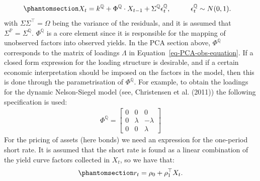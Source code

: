 \documentclass[
  letterpaper,
  DIV=11,
  numbers=noendperiod]{scrreprt}
\begin{document}
\begin{equation}\protect\phantomsection\label{eq-factorVarQ}{
\begin{align}
    X_{t} &= k^\mathbb{Q}+\Phi^\mathbb{Q} \cdot X_{t-1} +\Sigma^{\mathbb{Q}} \epsilon^\mathbb{Q}_{t}, \hspace{1cm} \epsilon^\mathbb{Q}_{t} \sim N(0,1).
\end{align}
}\end{equation} with \(\Sigma \Sigma^{\top}=\Omega\) being the variance
of the residuals, and it is assumed that
\(\Sigma^{\mathbb{P}}=\Sigma^{\mathbb{Q}}\). \(\Phi^{\mathbb{Q}}\) is a
core element since it is responsible for the mapping of unobserved
factors into observed yields. In the PCA section above,
\(\Phi^{\mathbb{Q}}\) corresponds to the matrix of loadings \(\Lambda\)
in Equation~\ref{eq-PCA-obs-equation}. If a closed form expression for
the loading structure is desirable, and if a certain economic
interpretation should be imposed on the factors in the model, then this
is done through the parametrisation of \(\Phi^{\mathbb{Q}}\). For
example, to obtain the loadings for the dynamic Nelson-Siegel model
(see, Christensen et al. (2011)) the following specification is used:
\begin{align}
    \Phi^{\mathbb{Q}} = \begin{bmatrix}  0 & 0 & 0\\
                                          0 & \lambda & -\lambda \\
                                            0 & 0 & \lambda  \end{bmatrix}
\end{align}
For the pricing of assets (here bonds) we need an expression for the
one-period short rate. It is assumed that the short rate is found as a
linear combination of the yield curve factors collected in \(X_t\), so
we have that:
\begin{equation}\protect\phantomsection\label{eq-shortRate}{
\begin{align}
    r_t = \rho_0 + \rho^{\top}_1 X_t.
\end{align}
}\end{equation}
\end{document}
